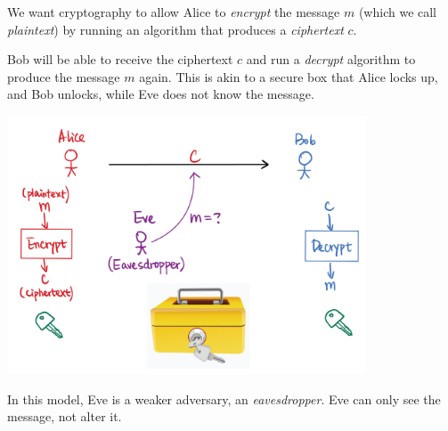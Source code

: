 \begin{definition}
    We want cryptography to allow Alice to \emph{encrypt} the message $m$ (which we call \emph{plaintext}) by running an algorithm that produces a \emph{ciphertext} $c$.

    Bob will be able to receive the ciphertext $c$ and run a \emph{decrypt} algorithm to produce the message $m$ again. This is akin to a secure box that Alice locks up, and Bob unlocks, while Eve does not know the message.

    \begin{center}
        \includegraphics[width=0.8\textwidth]{images/2023-01-26/message_secrecy.png}
    \end{center}

    In this model, Eve is a weaker adversary, an \emph{eavesdropper}. Eve can only see the message, not alter it.
\end{definition}

